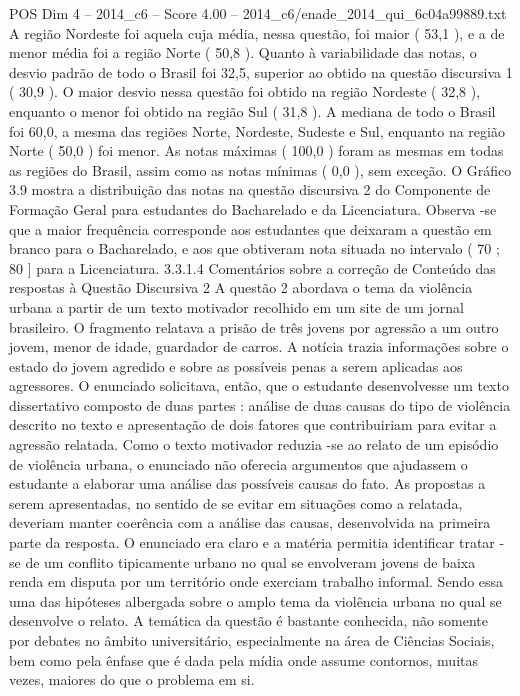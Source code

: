 \begin{textsample}{POS Dim 4 – 2014\_c6 – Score 4.00 – 2014\_c6/enade\_2014\_qui\_6c04a99889.txt}
A região Nordeste foi aquela cuja média, nessa questão, foi maior ( 53,1 ), e a de menor média foi a região Norte ( 50,8 ).
Quanto à variabilidade das notas, o desvio padrão de todo o Brasil foi 32,5, superior ao obtido na questão discursiva 1 ( 30,9 ).
O maior desvio nessa questão foi obtido na região Nordeste ( 32,8 ), enquanto o menor foi obtido na região Sul ( 31,8 ).
A mediana de todo o Brasil foi 60,0, a mesma das regiões Norte, Nordeste, Sudeste e Sul, enquanto na região Norte ( 50,0 ) foi menor.
As notas máximas ( 100,0 ) foram as mesmas em todas as regiões do Brasil, assim como as notas mínimas ( 0,0 ), sem exceção.
O Gráfico 3.9 mostra a distribuição das notas na questão discursiva 2 do Componente de Formação Geral para estudantes do Bacharelado e da Licenciatura.
Observa -se que a maior frequência corresponde aos estudantes que deixaram a questão em branco para o Bacharelado, e aos que obtiveram nota situada no intervalo ( 70 ; 80 ] para a Licenciatura. 3.3.1.4 Comentários sobre a correção de Conteúdo das respostas à Questão Discursiva 2 A questão 2 abordava o tema da violência urbana a partir de um texto motivador recolhido em um site de um jornal brasileiro.
O fragmento relatava a prisão de três jovens por agressão a um outro jovem, menor de idade, guardador de carros.
A notícia trazia informações sobre o estado do jovem agredido e sobre as possíveis penas a serem aplicadas aos agressores.
O enunciado solicitava, então, que o estudante desenvolvesse um texto dissertativo composto de duas partes : análise de duas causas do tipo de violência descrito no texto e apresentação de dois fatores que contribuiriam para evitar a agressão relatada.
Como o texto motivador reduzia -se ao relato de um episódio de violência urbana, o enunciado não oferecia argumentos que ajudassem o estudante a elaborar uma análise das possíveis causas do fato.
As propostas a serem apresentadas, no sentido de se evitar em situações como a relatada, deveriam manter coerência com a análise das causas, desenvolvida na primeira parte da resposta.
O enunciado era claro e a matéria permitia identificar tratar -se de um conflito tipicamente urbano no qual se envolveram jovens de baixa renda em disputa por um território onde exerciam trabalho informal.
Sendo essa uma das hipóteses albergada sobre o amplo tema da violência urbana no qual se desenvolve o relato.
A temática da questão é bastante conhecida, não somente por debates no âmbito universitário, especialmente na área de Ciências Sociais, bem como pela ênfase que é dada pela mídia onde assume contornos, muitas vezes, maiores do que o problema em si.

\end{textsample}
